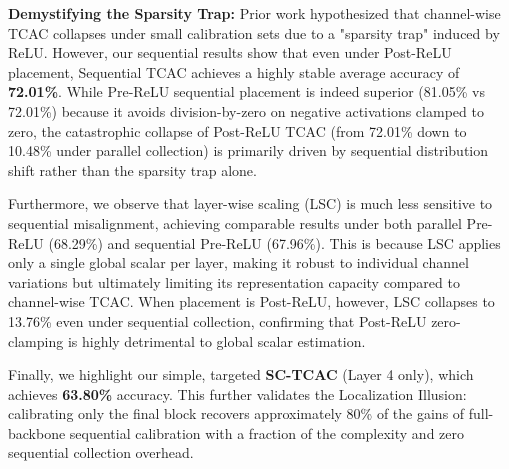 \documentclass{article}
\theoremstyle{plain}
\theoremstyle{definition}
\theoremstyle{remark}
\begin{document}
\textbf{Demystifying the Sparsity Trap:}
Prior work hypothesized that channel-wise TCAC collapses under small calibration sets due to a "sparsity trap" induced by ReLU. However, our sequential results show that even under Post-ReLU placement, Sequential TCAC achieves a highly stable average accuracy of \textbf{72.01\%}. While Pre-ReLU sequential placement is indeed superior (81.05\% vs 72.01\%) because it avoids division-by-zero on negative activations clamped to zero, the catastrophic collapse of Post-ReLU TCAC (from 72.01\% down to 10.48\% under parallel collection) is primarily driven by sequential distribution shift rather than the sparsity trap alone.

Furthermore, we observe that layer-wise scaling (LSC) is much less sensitive to sequential misalignment, achieving comparable results under both parallel Pre-ReLU (68.29\%) and sequential Pre-ReLU (67.96\%). This is because LSC applies only a single global scalar per layer, making it robust to individual channel variations but ultimately limiting its representation capacity compared to channel-wise TCAC. When placement is Post-ReLU, however, LSC collapses to 13.76\% even under sequential collection, confirming that Post-ReLU zero-clamping is highly detrimental to global scalar estimation.

Finally, we highlight our simple, targeted \textbf{SC-TCAC} (Layer 4 only), which achieves \textbf{63.80\%} accuracy. This further validates the Localization Illusion: calibrating only the final block recovers approximately 80\% of the gains of full-backbone sequential calibration with a fraction of the complexity and zero sequential collection overhead.
\end{document}

